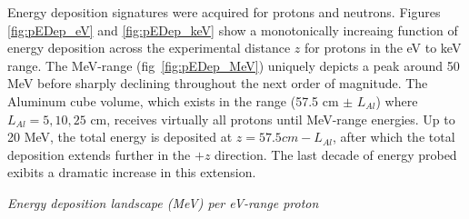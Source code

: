 \documentclass[11pt]{article}
\makeatletter
\newenvironment{figurehere}
{\def\@captype{figure}}{}
\makeatother
\begin{document}
\begin{multicols}{2}
Energy deposition signatures were acquired for protons and neutrons.  Figures \ref{fig:pEDep_eV} and \ref{fig:pEDep_keV} show a monotonically increaing function of energy deposition across the experimental distance $z$ for protons in the eV to keV range.  The MeV-range (fig~\ref{fig:pEDep_MeV}) uniquely depicts a peak around 50 MeV before sharply declining throughout the next order of magnitude.  The Aluminum cube volume, which exists in the range (57.5 cm $\pm$ $L_{Al}$) where $L_{Al}=5,10,25$ cm, receives virtually all protons until MeV-range energies.  Up to 20 MeV, the total energy is deposited at $z=57.5 cm - L_{Al}$, after which the total deposition extends further in the $+z$ direction.  The last decade of energy probed exibits a dramatic increase in this extension.

\vspace{0.15 cm}
\begin{figurehere}
\centering
{}
\caption{\small \emph{Energy deposition landscape (MeV) per eV-range proton}}
\label{fig:pEDep_eV}
\end{figurehere}
\vspace{0.15 cm}
\begin{figurehere}
\centering
{}

\end{figurehere}
\end{multicols}
\end{document}
